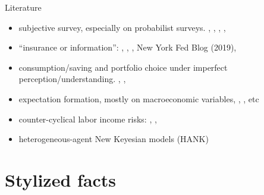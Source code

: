 \documentclass{beamer}
\begin{document}
\begin{frame}{Literature}
\begin{itemize}
	 \item subjective survey, especially on probabilist surveys.  \cite{manski_measuring_2004}, \cite{delavande2011measuring}, \cite{manski_survey_2018},  \cite{bertrand_people_2001}, \cite{armantier_overview_2017}
	\item ``insurance or information'':  \cite{kaufmann_disentangling_2009},  \cite{meghir2011earnings}, \cite{pistaferri_superior_2001}, New York Fed Blog (2019),  \cite{flavin_excess_1988}
   \item consumption/saving and portfolio choice under imperfect perception/understanding. \cite{rozsypal_overpersistence_2017}, \cite{carroll_sticky_2018}, \cite{lian2019imperfect}
   \item expectation formation, mostly on macroeconomic variables, \cite{coibion2012can}, \cite{fuhrer2018intrinsic}, etc

   \item counter-cyclical labor income risks: \cite{storesletten2004cyclical}, \cite{guvenen2014nature}, \cite{catherine_countercyclical_2019}
      \item heterogeneous-agent New Keyesian models (HANK)
  \end{itemize}
\end{frame}

\section{Stylized facts}
\end{document}

